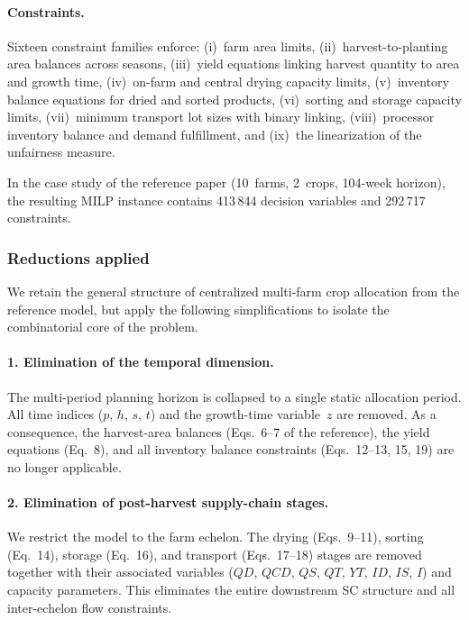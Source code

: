 \documentclass{oqireport}
\begin{document}
\paragraph{Constraints.}
Sixteen constraint families enforce: (i)~farm area limits, (ii)~harvest-to-planting area balances across seasons, (iii)~yield equations linking harvest quantity to area and growth time, (iv)~on-farm and central drying capacity limits, (v)~inventory balance equations for dried and sorted products, (vi)~sorting and storage capacity limits, (vii)~minimum transport lot sizes with binary linking, (viii)~processor inventory balance and demand fulfillment, and (ix)~the linearization of the unfairness measure.

In the case study of the reference paper (10~farms, 2~crops, 104-week horizon), the resulting MILP instance contains 413\,844 decision variables and 292\,717 constraints.

\subsubsection{Reductions applied}
\label{sub:reductions}

We retain the general structure of centralized multi-farm crop allocation from the reference model, but apply the following simplifications to isolate the combinatorial core of the problem.

\paragraph{1. Elimination of the temporal dimension.}
The multi-period planning horizon is collapsed to a single static allocation period. All time indices ($p$, $h$, $s$, $t$) and the growth-time variable~$z$ are removed. As a consequence, the harvest-area balances (Eqs.~6--7 of the reference), the yield equations (Eq.~8), and all inventory balance constraints (Eqs.~12--13, 15, 19) are no longer applicable.

\paragraph{2. Elimination of post-harvest supply-chain stages.}
We restrict the model to the farm echelon. The drying (Eqs.~9--11), sorting (Eq.~14), storage (Eq.~16), and transport (Eqs.~17--18) stages are removed together with their associated variables ($QD$, $QCD$, $QS$, $QT$, $YT$, $ID$, $IS$, $I$) and capacity parameters. This eliminates the entire downstream SC structure and all inter-echelon flow constraints.
\end{document}
